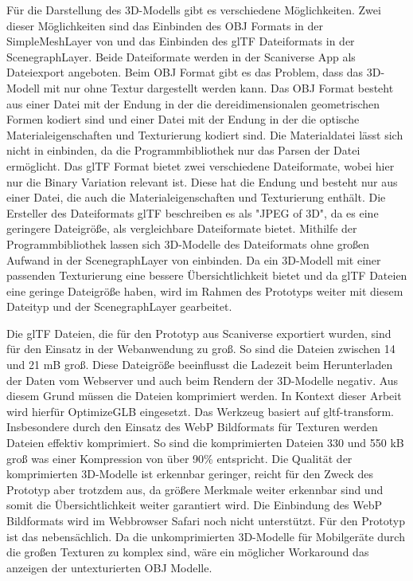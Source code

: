 Für die Darstellung des 3D-Modells gibt es verschiedene Möglichkeiten. Zwei dieser Möglichkeiten sind das Einbinden des \ac{OBJ} Formats in der SimpleMeshLayer 
von \deckgl{} und das Einbinden des \ac{glTF} Dateiformats in der ScenegraphLayer.
Beide Dateiformate werden in der Scaniverse App als Dateiexport angeboten. Beim \ac{OBJ} Format gibt es das Problem, dass das 3D-Modell mit \deckgl{} nur ohne Textur dargestellt werden kann. Das \ac{OBJ} Format besteht aus einer Datei mit der Endung \obj{} in der die dereidimensionalen geometrischen Formen kodiert sind und einer Datei mit der Endung \mtl{} in der die optische Materialeigenschaften und Texturierung kodiert sind. 
Die Materialdatei lässt sich nicht in \deckgl{} einbinden, da die \loadersgl{} Programmbibliothek nur das Parsen der \obj{} Datei ermöglicht. 
Das \ac{glTF} Format bietet zwei verschiedene Dateiformate, wobei hier nur die Binary Variation relevant ist. Diese hat die Endung \glb{} und besteht nur aus einer Datei, die auch die Materialeigenschaften und Texturierung enthält.
Die Ersteller des Dateiformats \ac{glTF} beschreiben es als "JPEG of 3D", da es eine geringere Dateigröße, als vergleichbare Dateiformate bietet.
Mithilfe der \loadersgl{} Programmbibliothek lassen sich 3D-Modelle des Dateiformats ohne großen Aufwand in der ScenegraphLayer von \deckgl{} einbinden. 
Da ein 3D-Modell mit einer passenden Texturierung eine bessere Übersichtlichkeit bietet und da \ac{glTF} Dateien eine geringe Dateigröße haben, wird im Rahmen des Prototyps weiter mit diesem Dateityp und der ScenegraphLayer gearbeitet.

Die \ac{glTF} Dateien, die für den Prototyp aus Scaniverse exportiert wurden, sind für den Einsatz in der Webanwendung zu groß. So sind die Dateien zwischen 14 und 21 \ac{mB} groß. 
Diese Dateigröße beeinflusst die Ladezeit beim Herunterladen der Daten vom Webserver und auch beim Rendern der 3D-Modelle negativ. Aus diesem Grund müssen die Dateien komprimiert werden. In Kontext dieser Arbeit wird hierfür OptimizeGLB eingesetzt. Das Werkzeug basiert auf gltf-transform. Insbesondere durch den Einsatz des \ac{WebP} Bildformats für Texturen werden Dateien effektiv komprimiert. 
So sind die komprimierten Dateien 330 und 550 \ac{kB} groß was einer Kompression von über 90\% entspricht.
Die Qualität der komprimierten 3D-Modelle ist erkennbar geringer, reicht für den Zweck des Prototyp aber trotzdem aus, da größere Merkmale weiter erkennbar sind und somit die Übersichtlichkeit weiter garantiert wird. Die Einbindung des \ac{WebP} Bildformats wird im Webbrowser Safari noch nicht unterstützt. 
Für den Prototyp ist das nebensächlich. Da die unkomprimierten 3D-Modelle für Mobilgeräte durch die großen Texturen zu komplex sind, wäre ein möglicher Workaround das anzeigen der untexturierten \ac{OBJ} Modelle.

